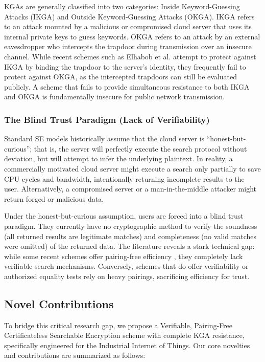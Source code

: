 \documentclass[10pt,journal,compsoc]{IEEEtran}
\begin{document}
KGAs are generally classified into two categories: Inside Keyword-Guessing Attacks (IKGA) and Outside Keyword-Guessing Attacks (OKGA). IKGA refers to an attack mounted by a malicious or compromised cloud server that uses its internal private keys to guess keywords. OKGA refers to an attack by an external eavesdropper who intercepts the trapdoor during transmission over an insecure channel. While recent schemes such as Elhabob et al. \cite{elhabob2020efficient} attempt to protect against IKGA by binding the trapdoor to the server's identity, they frequently fail to protect against OKGA, as the intercepted trapdoors can still be evaluated publicly. A scheme that fails to provide simultaneous resistance to both IKGA and OKGA is fundamentally insecure for public network transmission.

\subsubsection{The Blind Trust Paradigm (Lack of Verifiability)}
Standard SE models historically assume that the cloud server is ``honest-but-curious''; that is, the server will perfectly execute the search protocol without deviation, but will attempt to infer the underlying plaintext. In reality, a commercially motivated cloud server might execute a search only partially to save CPU cycles and bandwidth, intentionally returning incomplete results to the user. Alternatively, a compromised server or a man-in-the-middle attacker might return forged or malicious data. 

Under the honest-but-curious assumption, users are forced into a blind trust paradigm. They currently have no cryptographic method to verify the soundness (all returned results are legitimate matches) and completeness (no valid matches were omitted) of the returned data. The literature reveals a stark technical gap: while some recent schemes offer pairing-free efficiency \cite{liu2023pairing}, they completely lack verifiable search mechanisms. Conversely, schemes that do offer verifiability or authorized equality tests \cite{elhabob2020efficient} rely on heavy pairings, sacrificing efficiency for trust.

\subsection{Novel Contributions}
To bridge this critical research gap, we propose a Verifiable, Pairing-Free Certificateless Searchable Encryption scheme with complete KGA resistance, specifically engineered for the Industrial Internet of Things. Our core novelties and contributions are summarized as follows:
\end{document}
